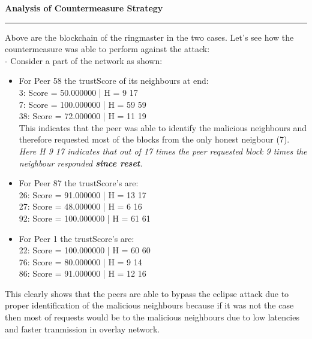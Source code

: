 \documentclass[a4paper,12pt]{article}
\newenvironment{solution}[2][]{%
\begin{mdframed}[linecolor=blue!70!black, linewidth=2pt, roundcorner=10pt, backgroundcolor=yellow!10!white, skipabove=12pt, skipbelow=12pt]%
	\textbf{\large #2}
	\par\noindent\rule{\textwidth}{0.4pt}
}{
\end{mdframed}
}
\begin{document}
\begin{solution}{Analysis of Countermeasure Strategy}
\newpage
Above are the blockchain of the ringmaster in the two cases. Let's see how the countermeasure was able to perform against the attack:\\

- Consider a part of the network as shown: 
\begin{figure}[H]
\centering
{} 
\end{figure}
\begin{itemize}
	\item For Peer 58 the trustScore of its neighbours at end: \\
	3: Score = 50.000000 | H = 9 17\\
	7: Score = 100.000000 | H = 59 59\\
	38: Score = 72.000000 | H = 11 19\\
	This indicates that the peer was able to identify the malicious neighbours and therefore requested most of the blocks from the only honest neigbour (7). \textit{Here H 9 17 indicates that out of 17 times the peer requested block 9 times the neighbour responded \textbf{since reset}.}
	
	\item For Peer 87 the trustScore's are:\\
	26: Score = 91.000000 | H = 13 17\\
	27: Score = 48.000000 | H = 6 16\\
	92: Score = 100.000000 | H = 61 61

	\item For Peer 1 the trustScore's are:\\
	22: Score = 100.000000 | H = 60 60\\
	76: Score = 80.000000 | H = 9 14\\
	86: Score = 91.000000 | H = 12 16

\end{itemize}

This clearly shows that the peers are able to bypass the eclipse attack due to proper identification of the malicious neighbours because if it was not the case then most of requests would be to the malicious neighbours due to low latencies and faster tranmission in overlay network.\\


\end{solution}
\end{document}
